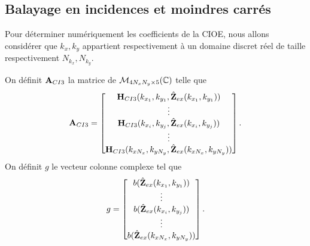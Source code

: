 

  \subsection{Balayage en incidences et moindres carrés}

    Pour déterminer numériquement les coefficients de la CIOE, nous allons considérer que \(k_x,k_y\) appartient respectivement à un domaine discret réel de taille respectivement \(N_{k_x}, N_{k_y}\).

    \begin{defn}
      On définit \(\mathbf{A}_{CI3}\) la matrice de \(\mathcal{M}_{4N_xN_y\times5}(\mathbb C)\) telle que
      \begin{equation*}
        \mathbf{A}_{CI3} = 
        \begin{bmatrix}
          \mathbf{H}_{CI3}(k_{x_1},k_{y_1},\hat{\mathbf{Z}}_{ex}(k_{x_1},k_{y_1}))
          \\
          \vdots
          \\
          \mathbf{H}_{CI3}(k_{x_i},k_{y_j},\hat{\mathbf{Z}}_{ex}(k_{x_i},k_{y_j}))
          \\
          \vdots
          \\
          \mathbf{H}_{CI3}(k_{xN_x},k_{yN_y},\hat{\mathbf{Z}}_{ex}(k_{xN_x},k_{yN_y}))
        \end{bmatrix}.
      \end{equation*}
      On définit \(g\) le vecteur colonne complexe tel que
      \begin{equation*}
        g = 
        \begin{bmatrix}
          b(\hat{\mathbf{Z}}_{ex}(k_{x_1},k_{y_1}))
          \\
          \vdots
          \\
          b(\hat{\mathbf{Z}}_{ex}(k_{x_i},k_{y_j}))
          \\
          \vdots
          \\
          b(\hat{\mathbf{Z}}_{ex}(k_{xN_x},k_{yN_y}))
        \end{bmatrix}.
      \end{equation*}
    \end{defn}


